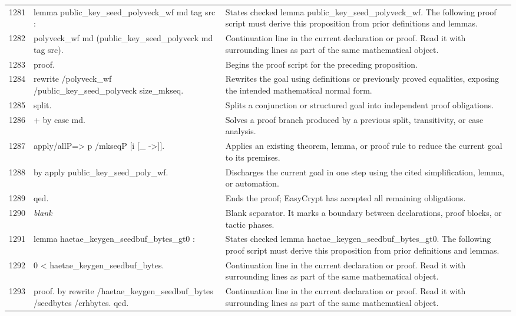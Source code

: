 \documentclass[10pt]{article}
\begin{document}
\begin{longtable}{r L{0.53\textwidth} L{0.37\textwidth}}
1281 & {\ttfamily\scriptsize lemma public\_key\_seed\_polyveck\_wf md tag src :} & States checked lemma public\_key\_seed\_polyveck\_wf.  The following proof script must derive this proposition from prior definitions and lemmas. \\
1282 & {\ttfamily\scriptsize   polyveck\_wf md (public\_key\_seed\_polyveck md tag src).} & Continuation line in the current declaration or proof.  Read it with surrounding lines as part of the same mathematical object. \\
1283 & {\ttfamily\scriptsize proof.} & Begins the proof script for the preceding proposition. \\
1284 & {\ttfamily\scriptsize rewrite /polyveck\_wf /public\_key\_seed\_polyveck size\_mkseq.} & Rewrites the goal using definitions or previously proved equalities, exposing the intended mathematical normal form. \\
1285 & {\ttfamily\scriptsize split.} & Splits a conjunction or structured goal into independent proof obligations. \\
1286 & {\ttfamily\scriptsize + by case md.} & Solves a proof branch produced by a previous split, transitivity, or case analysis. \\
1287 & {\ttfamily\scriptsize apply/allP=> p /mkseqP [i [\_ ->]].} & Applies an existing theorem, lemma, or proof rule to reduce the current goal to its premises. \\
1288 & {\ttfamily\scriptsize by apply public\_key\_seed\_poly\_wf.} & Discharges the current goal in one step using the cited simplification, lemma, or automation. \\
1289 & {\ttfamily\scriptsize qed.} & Ends the proof; EasyCrypt has accepted all remaining obligations. \\
1290 & {\ttfamily\scriptsize \emph{blank}} & Blank separator.  It marks a boundary between declarations, proof blocks, or tactic phases. \\
1291 & {\ttfamily\scriptsize lemma haetae\_keygen\_seedbuf\_bytes\_gt0 :} & States checked lemma haetae\_keygen\_seedbuf\_bytes\_gt0.  The following proof script must derive this proposition from prior definitions and lemmas. \\
1292 & {\ttfamily\scriptsize   0 < haetae\_keygen\_seedbuf\_bytes.} & Continuation line in the current declaration or proof.  Read it with surrounding lines as part of the same mathematical object. \\
1293 & {\ttfamily\scriptsize proof. by rewrite /haetae\_keygen\_seedbuf\_bytes /seedbytes /crhbytes. qed.} & Continuation line in the current declaration or proof.  Read it with surrounding lines as part of the same mathematical object. \\

\end{longtable}
\end{document}
